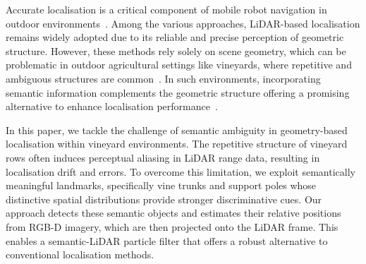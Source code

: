 \documentclass[letterpaper, 10 pt, conference]{ieeeconf}
\begin{document}

Accurate localisation is a critical component of mobile robot navigation in outdoor environments~\cite{aguiar2022localization}. Among the various approaches, LiDAR-based localisation remains widely adopted due to its reliable and precise perception of geometric structure. However, these methods rely solely on scene geometry, which can be problematic in outdoor agricultural settings like vineyards, where repetitive and ambiguous structures are common~\cite{nehme2021lidar}. In such environments, incorporating semantic information complements the geometric structure offering a promising alternative to enhance localisation performance~\cite{de2025keypoint}.


In this paper, we tackle the challenge of semantic ambiguity in geometry-based localisation within vineyard environments. The repetitive structure of vineyard rows often induces perceptual aliasing in LiDAR range data, resulting in localisation drift and errors. To overcome this limitation, we exploit semantically meaningful landmarks, specifically vine trunks and support poles whose distinctive spatial distributions provide stronger discriminative cues. Our approach detects these semantic objects and estimates their relative positions from RGB-D imagery, which are then projected onto the LiDAR frame. This enables a semantic-LiDAR particle filter that offers a robust alternative to conventional localisation methods.
\end{document}
